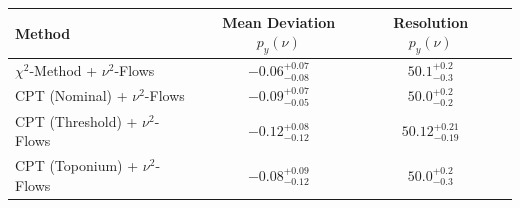     \begin{tabular}{lccc}
        \toprule
        Method & Mean Deviation $p_{y}(\nu)$ & Resolution $p_{y}(\nu)$ \\
        \midrule
        $\chi^2$-Method + $\nu^2$-Flows & $-0.06^{+0.07}_{-0.08}$ & $50.1^{+0.2}_{-0.3}$ \\
        CPT (Nominal) + $\nu^2$-Flows & $-0.09^{+0.07}_{-0.05}$ & $50.0^{+0.2}_{-0.2}$ \\
        CPT (Threshold) + $\nu^2$-Flows & $-0.12^{+0.08}_{-0.12}$ & $50.12^{+0.21}_{-0.19}$ \\
        CPT (Toponium) + $\nu^2$-Flows & $-0.08^{+0.09}_{-0.12}$ & $50.0^{+0.2}_{-0.3}$ \\
        \bottomrule
    \end{tabular}